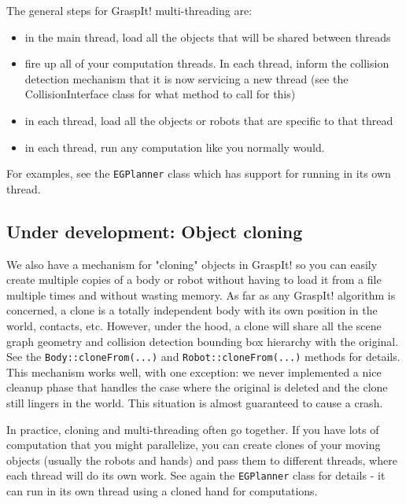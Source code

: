 The general steps for GraspIt! multi-threading are:
\begin{itemize}
\item in the main thread, load all the objects that will be shared
  between threads
\item fire up all of your computation threads. In each thread, inform
  the collision detection mechanism that it is now servicing a new
  thread (see the CollisionInterface class for what method to call for
  this)
\item in each thread, load all the objects or robots that are specific
  to that thread
\item in each thread, run any computation like you normally would.
\end{itemize}

For examples, see the \texttt{EGPlanner} class which has support for
running in its own thread.

\subsection{Under development: Object cloning}

We also have a mechanism for "cloning" objects in GraspIt! so you can
easily create multiple copies of a body or robot without having to
load it from a file multiple times and without wasting memory. As far
as any GraspIt! algorithm is concerned, a clone is a totally
independent body with its own position in the world, contacts,
etc. However, under the hood, a clone will share all the scene graph
geometry and collision detection bounding box hierarchy with the
original. See the \texttt{Body::cloneFrom(...)} and
\texttt{Robot::cloneFrom(...)}  methods for details. This mechanism
works well, with one exception: we never implemented a nice cleanup
phase that handles the case where the original is deleted and the
clone still lingers in the world. This situation is almost guaranteed
to cause a crash.

In practice, cloning and multi-threading often go together. If you
have lots of computation that you might parallelize, you can create
clones of your moving objects (usually the robots and hands) and pass
them to different threads, where each thread will do its own work. See
again the \texttt{EGPlanner} class for details - it can run in its own
thread using a cloned hand for computations.

